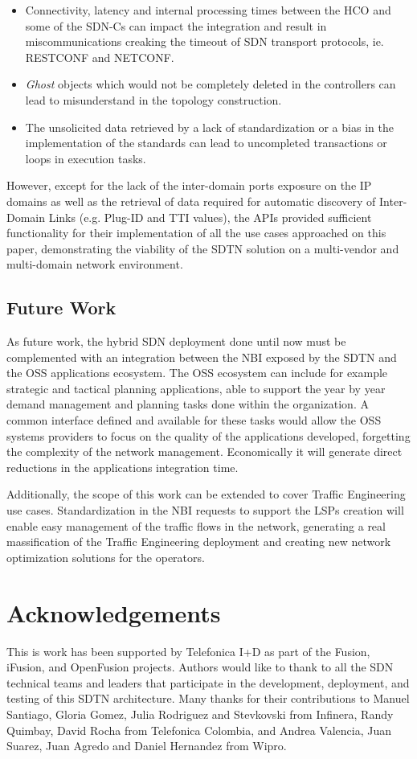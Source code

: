 \documentclass[a4paper,fleqn]{cas-dc}
\begin{document}
\begin{itemize}
    \item Connectivity, latency and internal processing times between the HCO and some of the SDN-Cs can impact the integration and result in miscommunications creaking the timeout of SDN transport protocols, ie. RESTCONF and NETCONF.  
    \item \textit{Ghost} objects which would not be completely deleted in the controllers can lead to misunderstand in the topology construction. 
    \item The unsolicited data retrieved by a lack of standardization or a bias in the implementation of the standards can lead to uncompleted transactions or loops in execution tasks. 
\end{itemize}
 However, except for the lack of the inter-domain ports exposure on the IP domains as well as the retrieval of data required for automatic discovery of Inter-Domain Links (e.g. Plug-ID and TTI values), the APIs provided sufficient functionality for their implementation of all the use cases approached on this paper, demonstrating the viability of the SDTN solution on a multi-vendor and multi-domain network environment.

\subsection{Future Work}
As future work, the hybrid SDN deployment done until now must be complemented with an integration between the NBI exposed by the SDTN and the OSS applications ecosystem. The OSS ecosystem can include for example strategic and tactical planning applications, able to support the year by year demand management and planning tasks done within the organization. A common interface defined and available for these tasks would allow the OSS systems providers to focus on the quality of the applications developed, forgetting the complexity of the network management. Economically it will generate direct reductions in the applications integration time.

Additionally, the scope of this work can be extended to cover Traffic Engineering use cases. Standardization in the NBI requests to support the LSPs creation will enable easy management of the traffic flows in the network, generating a real massification of the Traffic Engineering deployment and creating new network optimization solutions for the operators.

\printcredits

\section*{Acknowledgements}
This is work has been supported by Telefonica I+D as part of the Fusion, iFusion, and OpenFusion projects. Authors would like to thank to all the SDN technical teams and leaders that participate in the development, deployment, and testing of this SDTN architecture. Many thanks for their contributions to Manuel Santiago, Gloria Gomez, Julia Rodriguez and  Stevkovski from Infinera, Randy Quimbay, David Rocha from Telefonica Colombia, and Andrea Valencia, Juan Suarez, Juan Agredo and Daniel Hernandez from Wipro.   
\end{document}
